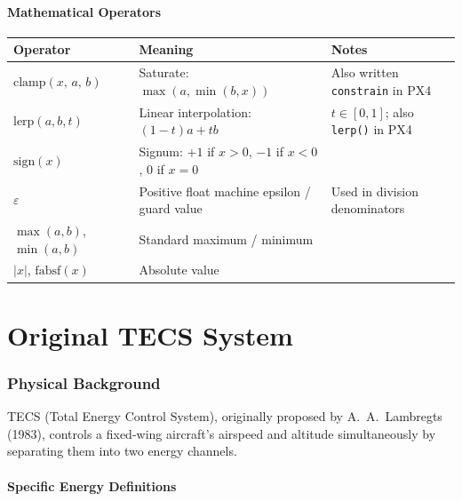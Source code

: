 \documentclass[12pt,a4paper]{article}
\begin{document}
\subsection*{Mathematical Operators}

\begin{center}
\begin{tabular}{p{2.5cm} p{8cm} p{5cm}}
\toprule
Operator & Meaning & Notes \\
\midrule
$\text{clamp}(x,\,a,\,b)$ & Saturate: $\max(a,\min(b,x))$ & Also written \texttt{constrain} in PX4 \\
$\text{lerp}(a,b,t)$ & Linear interpolation: $(1-t)a + tb$ & $t\in[0,1]$; also \texttt{lerp()} in PX4 \\
$\text{sign}(x)$ & Signum: $+1$ if $x>0$, $-1$ if $x<0$, $0$ if $x=0$ & \\
$\varepsilon$ & Positive float machine epsilon / guard value & Used in division denominators \\
$\max(a,b)$, $\min(a,b)$ & Standard maximum / minimum & \\
$|x|$, $\text{fabsf}(x)$ & Absolute value & \\
\bottomrule
\end{tabular}
\end{center}

\newpage
\part{Original TECS System}

\section{Physical Background}

TECS (Total Energy Control System), originally proposed by A.~A.~Lambregts
(1983), controls a fixed-wing aircraft's airspeed and altitude simultaneously
by separating them into two energy channels.

\subsection{Specific Energy Definitions}
\end{document}
